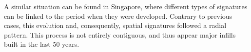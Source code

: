 A similar situation can be found in Singapore, where different types of signatures can be linked
to the period when they were developed. Contrary
to previous cases, this evolution and, consequently, spatial signatures
followed a radial pattern. This process is not entirely contiguous, and thus
appear major infills built in the last 50 years.
